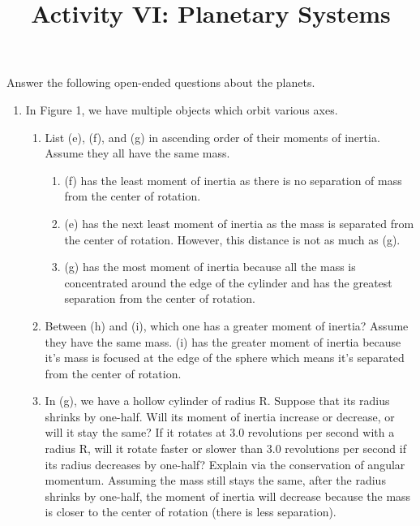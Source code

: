 \documentclass[12pt]{article}
\begin{document}
\title{Activity VI: Planetary Systems}

\maketitle

Answer the following open-ended questions about the planets.
\begin{enumerate}
        \item In Figure 1, we have multiple objects which orbit various axes.
            \begin{enumerate}
              \item List (e), (f), and (g) in ascending order of their moments of inertia. Assume they all have the same mass.
                    \begin{enumerate}
                        \item (f) has the least moment of inertia as there is no separation of mass from the center of rotation.
                        \item (e) has the next least moment of inertia as the mass is separated from the center of rotation. However, this distance is not as much as (g).
                        \item (g) has the most moment of inertia because all the mass is concentrated around the edge of the cylinder and has the greatest separation from the center of rotation.
                    \end{enumerate}
              \item Between (h) and (i), which one has a greater moment of inertia? Assume they have the same mass.\newline\newline
                    (i) has the greater moment of inertia because it's mass is focused at the edge of the sphere which means it's separated from the center of rotation.

              \item In (g), we have a hollow cylinder of radius R. Suppose that its radius shrinks by one-half. Will its moment of inertia increase or decrease, or will it stay the same? If it rotates at 3.0 revolutions per second with a radius R, will it rotate faster or slower than 3.0 revolutions per second if its radius decreases by one-half? Explain via the conservation of angular momentum.\newline\newline
                    Assuming the mass still stays the same, after the radius shrinks by one-half, the moment of inertia will decrease because the mass is closer to the center of rotation (there is less separation).\newline


\end{enumerate}
\end{enumerate}
\end{document}
